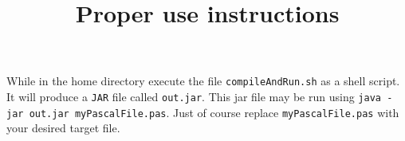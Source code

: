 \documentclass{article}
\title{Proper use instructions}
\begin{document}
\maketitle
While in the home directory execute the file \texttt{compileAndRun.sh} as a shell script. It will produce a \texttt{JAR} file called \texttt{out.jar}. This jar file may be run using \texttt{java -jar out.jar myPascalFile.pas}. Just of course replace \texttt{myPascalFile.pas} with your desired target file.
\end{document}
